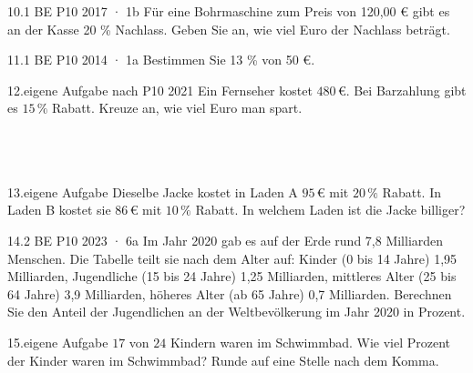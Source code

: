 \documentclass[11pt]{article}
\begin{document}
\begin{pfaufgabe}{10.}{1 BE \textperiodcentered{} P10 2017 · 1b}
Für eine Bohrmaschine zum Preis von 120,00 € gibt es an der Kasse 20 \% Nachlass. Geben Sie an, wie viel Euro der Nachlass beträgt.
\end{pfaufgabe}
\begin{pfaufgabe}{11.}{1 BE \textperiodcentered{} P10 2014 · 1a}
Bestimmen Sie 13 \% von 50 €.
\end{pfaufgabe}
\begin{pfaufgabe}{12.}{eigene Aufgabe nach P10 2021}
Ein Fernseher kostet $480\,€$. Bei Barzahlung gibt es $15\,\%$ Rabatt. Kreuze an, wie viel Euro man spart.\\ \\ \\ \\ 
\end{pfaufgabe}
\begin{pfaufgabe}{13.}{eigene Aufgabe}
Dieselbe Jacke kostet in Laden A $95\,€$ mit $20\,\%$ Rabatt. In Laden B kostet sie $86\,€$ mit $10\,\%$ Rabatt. In welchem Laden ist die Jacke billiger?
\end{pfaufgabe}
\begin{pfaufgabe}{14.}{2 BE \textperiodcentered{} P10 2023 · 6a}
Im Jahr 2020 gab es auf der Erde rund 7,8 Milliarden Menschen. Die Tabelle teilt sie nach dem Alter auf: Kinder (0 bis 14 Jahre) 1,95 Milliarden, Jugendliche (15 bis 24 Jahre) 1,25 Milliarden, mittleres Alter (25 bis 64 Jahre) 3,9 Milliarden, höheres Alter (ab 65 Jahre) 0,7 Milliarden. Berechnen Sie den Anteil der Jugendlichen an der Weltbevölkerung im Jahr 2020 in Prozent.
\end{pfaufgabe}
\begin{pfaufgabe}{15.}{eigene Aufgabe}
$17$ von $24$ Kindern waren im Schwimmbad. Wie viel Prozent der Kinder waren im Schwimmbad? Runde auf eine Stelle nach dem Komma.
\end{pfaufgabe}
\end{document}
